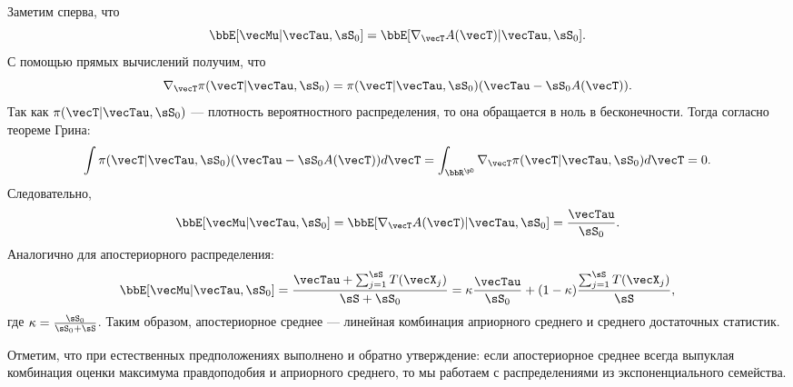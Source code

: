 Заметим сперва, что 
\[
\bbE [\vecMu | \vecTau, \sS_0] = \bbE [\nabla_{\vecT} A(\vecT) | \vecTau, \sS_0].
\]
С помощью прямых вычислений получим, что
\[
\nabla_{\vecT} \pi(\vecT| \vecTau, \sS_0) = \pi(\vecT| \vecTau, \sS_0) (\vecTau - \sS_0 A(\vecT)).
\]
Так как $\pi(\vecT| \vecTau, \sS_0)$ --- плотность вероятностного распределения, то она обращается в ноль в бесконечности.
Тогда согласно теореме Грина:
\[
\int \pi(\vecT| \vecTau, \sS_0) (\vecTau - \sS_0 A(\vecT)) d\vecT =
\int_{\bbR^\pD} \nabla_{\vecT} \pi(\vecT| \vecTau, \sS_0) d\vecT = 0.
\]
Следовательно, 
\[
\bbE [\vecMu | \vecTau, \sS_0] = \bbE [\nabla_{\vecT} A(\vecT) | \vecTau, \sS_0] = \frac{\vecTau}{\sS_0}.
\]
Аналогично для апостериорного распределения:
\[
\bbE [\vecMu | \vecTau, \sS_0] = \frac{\vecTau + \sum_{j = 1}^\sS T(\vecX_j)}{\sS + \sS_0} = \kappa \frac{\vecTau}{\sS_0} + (1 - \kappa) \frac{\sum_{j = 1}^\sS T(\vecX_j)}{\sS},
\]
где $\kappa = \frac{\sS_0}{\sS_0 + \sS}$.
Таким образом, апостериорное среднее --- линейная комбинация априорного среднего и среднего достаточных статистик.

Отметим, что при естественных предположениях выполнено и обратно утверждение:
если апостериорное среднее всегда выпуклая комбинация оценки максимума правдоподобия и априорного среднего,
то мы работаем с распределениями из экспоненциального семейства.







